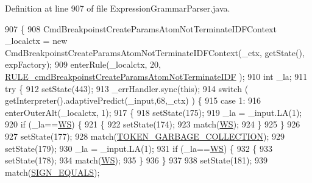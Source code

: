 Definition at line 907 of file Expression\+Grammar\+Parser.\+java.


\begin{DoxyCode}
907                                                                                                            
                                                                       \{
908     CmdBreakpoinstCreateParamsAtomNotTerminateIDFContext \_localctx = \textcolor{keyword}{new} 
      CmdBreakpoinstCreateParamsAtomNotTerminateIDFContext(\_ctx, getState(), expFactory);
909     enterRule(\_localctx, 20, \hyperlink{classgov_1_1nasa_1_1jpf_1_1inspector_1_1server_1_1expression_1_1parser_1_1_expression_grammar_parser_a59c98c595cc9a8f02dfc8619b41471b5}{RULE\_cmdBreakpoinstCreateParamsAtomNotTerminateIDF}
      );
910     \textcolor{keywordtype}{int} \_la;
911     \textcolor{keywordflow}{try} \{
912       setState(443);
913       \_errHandler.sync(\textcolor{keyword}{this});
914       \textcolor{keywordflow}{switch} ( getInterpreter().adaptivePredict(\_input,68,\_ctx) ) \{
915       \textcolor{keywordflow}{case} 1:
916         enterOuterAlt(\_localctx, 1);
917         \{
918         setState(175);
919         \_la = \_input.LA(1);
920         \textcolor{keywordflow}{if} (\_la==\hyperlink{classgov_1_1nasa_1_1jpf_1_1inspector_1_1server_1_1expression_1_1parser_1_1_expression_grammar_parser_ace44714ae633c7b14794cc5a24d9ebf3}{WS}) \{
921           \{
922           setState(174);
923           match(\hyperlink{classgov_1_1nasa_1_1jpf_1_1inspector_1_1server_1_1expression_1_1parser_1_1_expression_grammar_parser_ace44714ae633c7b14794cc5a24d9ebf3}{WS});
924           \}
925         \}
926 
927         setState(177);
928         match(\hyperlink{classgov_1_1nasa_1_1jpf_1_1inspector_1_1server_1_1expression_1_1parser_1_1_expression_grammar_parser_afa0da40e2e859e74d226887f17ee0640}{TOKEN\_GARBAGE\_COLLECTION});
929         setState(179);
930         \_la = \_input.LA(1);
931         \textcolor{keywordflow}{if} (\_la==\hyperlink{classgov_1_1nasa_1_1jpf_1_1inspector_1_1server_1_1expression_1_1parser_1_1_expression_grammar_parser_ace44714ae633c7b14794cc5a24d9ebf3}{WS}) \{
932           \{
933           setState(178);
934           match(\hyperlink{classgov_1_1nasa_1_1jpf_1_1inspector_1_1server_1_1expression_1_1parser_1_1_expression_grammar_parser_ace44714ae633c7b14794cc5a24d9ebf3}{WS});
935           \}
936         \}
937 
938         setState(181);
939         match(\hyperlink{classgov_1_1nasa_1_1jpf_1_1inspector_1_1server_1_1expression_1_1parser_1_1_expression_grammar_parser_a4dc93cc6563a32e75e7006cb71acb7b7}{SIGN\_EQUALS});

\end{DoxyCode}
